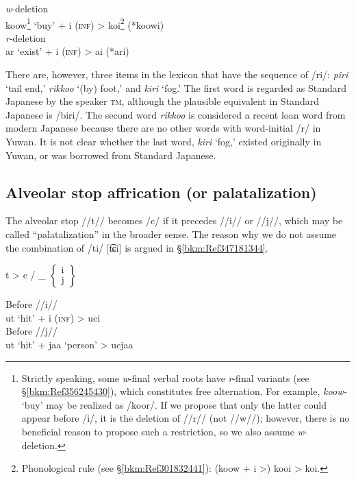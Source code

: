\ex
\ea \textit{w}{}-deletion\\
     koow\footnote{Strictly speaking, some \textit{w}{}-final verbal roots have \textit{r}{}-final variants (see §\ref{bkm:Ref356245430}), which constitutes free alternation. For example, \textit{koow-} ‘buy’ may be realized as /koor/. If we propose that only the latter could appear before /i/, it is the deletion of //r// (not //w//); however, there is no beneficial reason to propose such a restriction, so we also assume \textit{w}{}-deletion.}   ‘buy’   +  i  (\textsc{inf})  >  koi\footnote{Phonological rule (see §\ref{bkm:Ref301832441}): (koow + i >) kooi > koi.}  (*koowi)\\
\ex \textit{r}{}-deletion\\
      ar   ‘exist’   +   i   (\textsc{inf})   >   ai   (*ari)\\
\z
\z

There are, however, three items in the lexicon that have the sequence of /ri/: \textit{piri} ‘tail end,’ \textit{rikkoo} ‘(by) foot,’ and \textit{kiri} ‘fog.’ The first word is regarded as Standard Japanese by the speaker \textsc{tm}, although the plausible equivalent in Standard Japanese is /biri/. The second word \textit{rikkoo} is considered a recent loan word from modern Japanese because there are no other words with word-initial /r/ in Yuwan. It is not clear whether the last word, \textit{kiri} ‘fog,’ existed originally in Yuwan, or was borrowed from Standard Japanese.

\subsection{Alveolar stop affrication (or palatalization)}
\label{bkm:Ref347180796}\hypertarget{RefHeadingToc395696979}{}
The alveolar stop //t// becomes /c/ if it precedes //i// or //j//, which may be called “palatalization” in the broader sense. The reason why we do not assume the combination of /ti/ [t͡ɕi] is argued in §\ref{bkm:Ref347181344}.

\ea t   >   c  /  \_ $\left\{\begin{array}{c} \text{i}\\\text{j}\end{array}\right\}$ 

\ex
\ea Before //i//\\
    ut   ‘hit’   +   i   (\textsc{inf})   >   uci\\
\ex Before //j//\\
    ut   ‘hit’   +   jaa   ‘person’   >   ucjaa\\
\z
\z

